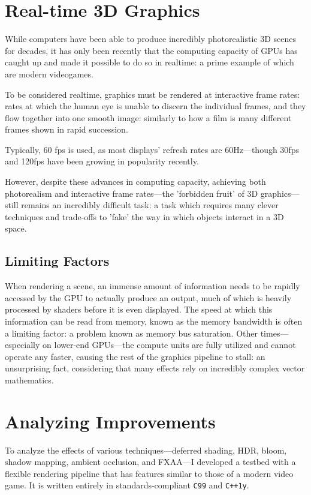 \documentclass[11pt, oneside]{report}
\begin{document}
\section{Real-time 3D Graphics}
While computers have been able to produce incredibly photorealistic 3D scenes for decades, it has only been recently that the computing capacity of \glspl{GPU} has caught up and made it possible to do so in realtime: a prime example of which are modern videogames.

To be considered realtime, graphics must be rendered at interactive \glspl{frame rate}: rates at which the human eye is unable to discern the individual frames, and they flow together into one smooth image: similarly to how a film is many different frames shown in rapid succession.

Typically, 60 \gls{fps} is used, as most displays' \glspl{refresh rate} are 60Hz---though 30\gls{fps} and 120\gls{fps} have been growing in popularity recently.

However, despite these advances in computing capacity, achieving both photorealism and interactive \glspl{frame rate}---the 'forbidden fruit' of 3D graphics---still remains an incredibly difficult task: a task which requires many clever techniques and trade-offs to 'fake' the way in which objects interact in a 3D space.

\subsection{Limiting Factors}
When rendering a scene, an immense amount of information needs to be rapidly accessed by the \gls{GPU} to actually produce an output, much of which is heavily processed by \glspl{shader} before it is even displayed. The speed at which this information can be read from memory, known as the \gls{memory bandwidth} is often a limiting factor: a problem known as memory bus saturation. Other times---especially on lower-end \glspl{GPU}---the \glspl{compute unit} are fully utilized and cannot operate any faster, causing the rest of the \gls{graphics pipeline} to stall: an unsurprising fact, considering that many effects rely on incredibly complex vector mathematics.

\section{Analyzing Improvements}
To analyze the effects of various techniques—\gls{deferred shading}, \gls{HDR}, \gls{bloom}, \gls{shadow mapping}, \gls{ambient occlusion}, and \gls{FXAA}—I developed a testbed with a flexible rendering pipeline that has features similar to those of a modern video game. It is written entirely in standards-compliant \texttt{C99} and \texttt{C++1y}.
\end{document}
